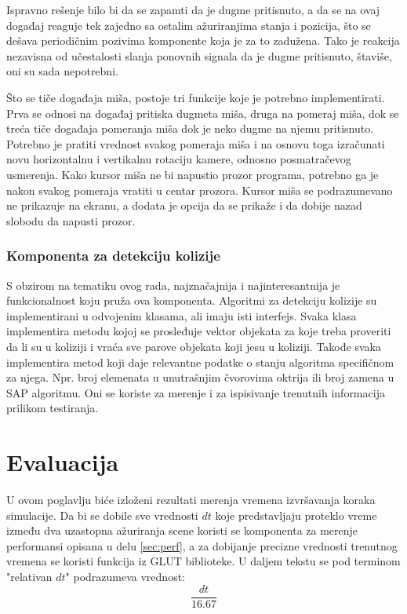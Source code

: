 \documentclass[12pt,oneside]{memoir}
\begin{document}
Ispravno rešenje bilo bi da se zapamti da je dugme pritisnuto,  a da se na ovaj događaj reaguje  tek zajedno sa ostalim ažuriranjima 
stanja i pozicija, što se dešava periodičnim pozivima komponente koja je za to zadužena. Tako je reakcija nezavisna od učestalosti 
slanja ponovnih signala da je dugme pritisnuto, štaviše, oni su sada nepotrebni. 

Što se tiče događaja miša, postoje tri funkcije koje je potrebno implementirati. Prva se odnosi na događaj pritiska 
dugmeta miša, druga na pomeraj miša, dok se treća tiče događaja pomeranja miša dok je neko dugme na njemu pritisnuto.
Potrebno je pratiti vrednost svakog pomeraja miša i na osnovu toga izračunati novu horizontalnu i vertikalnu rotaciju 
kamere, odnosno posmatračevog usmerenja.
Kako kursor miša ne bi napustio prozor programa, 
potrebno ga je nakon svakog pomeraja vratiti u centar prozora.
Kursor miša se podrazumevano ne prikazuje na ekranu, a dodata je opcija da se prikaže i da dobije nazad slobodu da napusti prozor.

\subsection{Komponenta za detekciju kolizije}

S obzirom na tematiku ovog rada, najznačajnija i najinteresantnija je funkcionalnost koju pruža ova komponenta.
Algoritmi za detekciju kolizije su implementirani u odvojenim klasama, ali imaju isti interfejs.
Svaka klasa implementira metodu kojoj se prosleđuje vektor objekata za koje treba proveriti da li su u koliziji
i vraća sve parove objekata koji jesu u koliziji. Takođe svaka implementira metod koji daje relevantne podatke 
o stanju algoritma specifičnom za njega. Npr. broj elemenata u unutrašnjim čvorovima oktrija ili broj 
zamena u SAP algoritmu. Oni se koriste za merenje i za ispisivanje trenutnih informacija prilikom testiranja.

\chapter{Evaluacija}
\label{sec:evaluacija}

U ovom poglavlju biće izloženi rezultati merenja vremena izvršavanja koraka simulacije.
Da bi se dobile sve vrednosti $dt$ koje predstavljaju proteklo vreme između dva uzastopna ažuriranja scene
koristi se komponenta za merenje performansi opisana u delu \ref{sec:perf}, a za dobijanje precizne vrednosti trenutnog vremena se koristi funkcija iz GLUT biblioteke.
U daljem tekstu se pod terminom "relativan $dt$" podrazumeva vrednost:
$$ \frac{ dt }{16.67} $$
\end{document}
